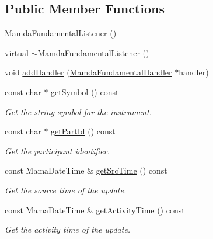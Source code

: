 \subsection*{Public Member Functions}
\begin{CompactItemize}
\item 
\hyperlink{classWombat_1_1MamdaFundamentalListener_472613466103dc23a863c407f95256c6}{Mamda\-Fundamental\-Listener} ()
\item 
virtual \hyperlink{classWombat_1_1MamdaFundamentalListener_a0255445090ed91d283ddb6d637abd42}{$\sim$Mamda\-Fundamental\-Listener} ()
\item 
void \hyperlink{classWombat_1_1MamdaFundamentalListener_6b29c6f9655c0cfce28fe49e658db2a9}{add\-Handler} (\hyperlink{classWombat_1_1MamdaFundamentalHandler}{Mamda\-Fundamental\-Handler} $\ast$handler)
\item 
const char $\ast$ \hyperlink{classWombat_1_1MamdaFundamentalListener_0d2fdebba24d7951873278facc446865}{get\-Symbol} () const 
\begin{CompactList}\small\item\em Get the string symbol for the instrument. \item\end{CompactList}\item 
const char $\ast$ \hyperlink{classWombat_1_1MamdaFundamentalListener_9902a2a7113039defa7114cbf2c88250}{get\-Part\-Id} () const 
\begin{CompactList}\small\item\em Get the participant identifier. \item\end{CompactList}\item 
const Mama\-Date\-Time \& \hyperlink{classWombat_1_1MamdaFundamentalListener_f28f624d9a523c9d0db2717f2b3b69e9}{get\-Src\-Time} () const 
\begin{CompactList}\small\item\em Get the source time of the update. \item\end{CompactList}\item 
const Mama\-Date\-Time \& \hyperlink{classWombat_1_1MamdaFundamentalListener_b8d6e8e722a1654997c23f23a1ca4455}{get\-Activity\-Time} () const 
\begin{CompactList}\small\item\em Get the activity time of the update. \item\end{CompactList}\item 

\end{CompactItemize}
